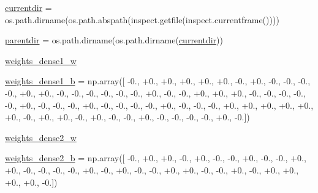 \begin{DoxyCompactItemize}
\item 
\hyperlink{namespacepybullet-gym_1_1pybulletgym_1_1tests_1_1roboschool_1_1agents_1_1_inverted_double_pendulum_py_bullet_env__v0__2017may_aa1518ab50cd6f1b97e4861dd7199a7b8}{currentdir} = os.\+path.\+dirname(os.\+path.\+abspath(inspect.\+getfile(inspect.\+currentframe())))
\item 
\hyperlink{namespacepybullet-gym_1_1pybulletgym_1_1tests_1_1roboschool_1_1agents_1_1_inverted_double_pendulum_py_bullet_env__v0__2017may_a8559b5f42e710ab4ddf678e93f9dd22f}{parentdir} = os.\+path.\+dirname(os.\+path.\+dirname(\hyperlink{namespacepybullet-gym_1_1pybulletgym_1_1tests_1_1roboschool_1_1agents_1_1_inverted_double_pendulum_py_bullet_env__v0__2017may_aa1518ab50cd6f1b97e4861dd7199a7b8}{currentdir}))
\item 
\hyperlink{namespacepybullet-gym_1_1pybulletgym_1_1tests_1_1roboschool_1_1agents_1_1_inverted_double_pendulum_py_bullet_env__v0__2017may_a6c79d78cab0ba602a8e9cbc786131074}{weights\+\_\+dense1\+\_\+w}
\item 
\hyperlink{namespacepybullet-gym_1_1pybulletgym_1_1tests_1_1roboschool_1_1agents_1_1_inverted_double_pendulum_py_bullet_env__v0__2017may_aa5ce5121a8d57bba7d48e04033b8af53}{weights\+\_\+dense1\+\_\+b} = np.\+array(\mbox{[} -\/0., +0., +0., +0., +0., +0., -\/0., +0., -\/0., -\/0., -\/0., -\/0., +0., +0., -\/0., -\/0., -\/0., -\/0., -\/0., -\/0., +0., -\/0., -\/0., +0., +0., +0., -\/0., -\/0., -\/0., -\/0., -\/0., +0., -\/0., -\/0., -\/0., +0., -\/0., -\/0., -\/0., -\/0., +0., -\/0., -\/0., -\/0., +0., +0., +0., +0., +0., +0., -\/0., +0., +0., -\/0., +0., -\/0., -\/0., +0., -\/0., -\/0., -\/0., -\/0., +0., -\/0.\mbox{]})
\item 
\hyperlink{namespacepybullet-gym_1_1pybulletgym_1_1tests_1_1roboschool_1_1agents_1_1_inverted_double_pendulum_py_bullet_env__v0__2017may_a2fc109512a02cab097247e0f655b89f4}{weights\+\_\+dense2\+\_\+w}
\item 
\hyperlink{namespacepybullet-gym_1_1pybulletgym_1_1tests_1_1roboschool_1_1agents_1_1_inverted_double_pendulum_py_bullet_env__v0__2017may_a23eabd1259c88e2b127ba99743ed5050}{weights\+\_\+dense2\+\_\+b} = np.\+array(\mbox{[} -\/0., +0., +0., -\/0., +0., -\/0., -\/0., +0., -\/0., -\/0., +0., +0., -\/0., -\/0., -\/0., -\/0., +0., -\/0., +0., -\/0., -\/0., +0., +0., -\/0., -\/0., +0., -\/0., +0., +0., +0., +0., -\/0.\mbox{]})

\end{DoxyCompactItemize}
